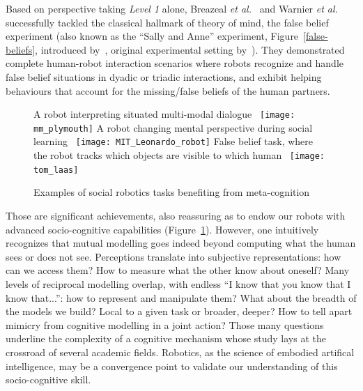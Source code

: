 \documentclass{sig-alternate}
\newcommand{\etal}{{\textit{et al.~}}}
\begin{document}
Based on perspective taking \emph{Level 1} alone, Breazeal
\etal\cite{breazeal2009embodied} and Warnier \etal\cite{warnier2012when}
successfully tackled the classical hallmark of theory of mind, the false belief
experiment (also known as the ``Sally and Anne'' experiment,
Figure~\ref{false-beliefs}, introduced by~\cite{wimmer1983beliefs}, original
experimental setting by~\cite{baron1985does}). They demonstrated complete
human-robot interaction scenarios where robots recognize and handle false belief
situations in dyadic or triadic interactions, and exhibit helping behaviours
that account for the missing/false beliefs of the human partners.

\begin{figure}[htb]
\centering
\subcaptionbox
    {\small A robot interpreting situated multi-modal dialogue~\cite{belpaeme2012multimodal}}
    {\texttt{[image: mm\_plymouth]}}
\hspace{0.5cm}
\subcaptionbox
    {\small A robot changing mental perspective during social learning~\cite{breazeal2009embodied}}
    {\texttt{[image: MIT\_Leonardo\_robot]}}
\hspace{0.5cm}
\subcaptionbox
    {\small False belief task, where the robot tracks which objects are visible
    to which human~\cite{warnier2012when}}
    {\texttt{[image: tom\_laas]}}
\caption{\small Examples of social robotics tasks benefiting from meta-cognition}

\label{fig:mm_robotics}
\end{figure}

Those are significant achievements, also reassuring as to endow our robots with
advanced socio-cognitive capabilities (Figure~\ref{fig:mm_robotics}).  However,
one intuitively recognizes that mutual modelling goes indeed beyond computing
what the human sees or does not see. Perceptions translate into subjective
representations: how can we access them? How to measure what the other know
about oneself? Many levels of reciprocal modelling overlap, with endless ``I
know that you know that I know that...'': how to represent and manipulate them?
What about the breadth of the models we build?  Local to a given task or
broader, deeper? How to tell apart mimicry from cognitive modelling in a joint
action?  Those many questions underline the complexity of a cognitive mechanism
whose study lays at the crossroad of several academic fields. Robotics, as the
science of embodied artifical intelligence, may be a convergence point to
validate our understanding of this socio-cognitive skill.
\end{document}
